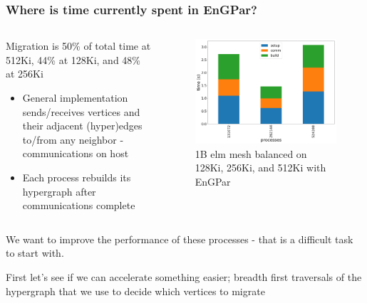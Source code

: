 \documentclass{beamer}
\begin{document}
\begin{frame}
  \frametitle{Where is time currently spent in EnGPar?}
  \begin{columns}
    \begin{column}{0.5\textwidth}
      Migration is 50\% of total time at 512Ki, 44\% at 128Ki, and 48\% at 256Ki
      \begin{itemize}
        \item General implementation sends/receives vertices and their adjacent
          (hyper)edges to/from any neighbor - communications on host
        \item Each process rebuilds its hypergraph after communications complete
      \end{itemize}
    \end{column}

    \begin{column}{0.5\textwidth}
      \begin{figure}
        \centering
        \includegraphics[width=.8\textwidth]{results/aero1Belm/migration.png}\\
        \tiny 1B elm mesh balanced on 128Ki, 256Ki, and 512Ki with EnGPar
      \end{figure}
    \end{column}
  \end{columns}
  \bigskip
  We want to improve the performance of these processes - that is a difficult
  task to start with.
  
  First let's see if we can accelerate something easier; breadth first
  traversals of the hypergraph that we use to decide which vertices to
  migrate
\end{frame}
\end{document}
